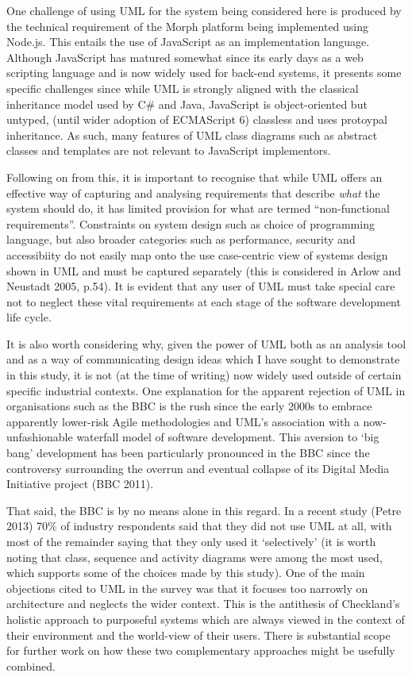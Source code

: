 \documentclass[a4paper]{article}
\begin{document}
One challenge of using UML for the system being considered here is produced by the technical requirement of the Morph platform being implemented using Node.js. This entails the use of JavaScript as an implementation language. Although JavaScript has matured somewhat since its early days as a web scripting language and is now widely used for back-end systems, it presents some specific challenges since while UML is strongly aligned with the classical inheritance model used by C\# and Java, JavaScript is object-oriented but untyped, (until wider adoption of ECMAScript 6) classless and uses protoypal inheritance. As such, many features of UML class diagrams such as abstract classes and templates are not relevant to JavaScript implementors.

Following on from this, it is important to recognise that while UML offers an effective way of capturing and analysing requirements that describe \textit{what} the system should do, it has limited provision for what are termed ``non-functional requirements''. Constraints on system design such as choice of programming language, but also broader categories such as performance, security and accessibiity do not easily map onto the use case-centric view of systems design shown in UML and must be captured separately (this is considered in Arlow and Neustadt 2005, p.54). It is evident that any user of UML must take special care not to neglect these vital requirements at each stage of the software development life cycle.

It is also worth considering why, given the power of UML both as an analysis tool and as a way of communicating design ideas which I have sought to demonstrate in this study, it is not (at the time of writing) now widely used outside of certain specific industrial contexts. One explanation for the apparent rejection of UML in organisations such as the BBC is the rush since the early 2000s to embrace apparently lower-risk Agile methodologies and UML's association with a now-unfashionable waterfall model of software development. This aversion to `big bang' development has been particularly pronounced in the BBC since the controversy surrounding the overrun and eventual collapse of its Digital Media Initiative project (BBC 2011).

That said, the BBC is by no means alone in this regard. In a recent study (Petre 2013) 70\% of industry respondents said that they did not use UML at all, with most of the remainder saying that they only used it `selectively' (it is worth noting that class, sequence and activity diagrams were among the most used, which supports some of the choices made by this study). One of the main objections cited to UML in the survey was that it focuses too narrowly on architecture and neglects the wider context. This is the antithesis of Checkland's holistic approach to purposeful systems which are always viewed in the context of their environment and the world-view of their users. There is substantial scope for further work on how these two complementary approaches might be usefully combined.
\end{document}
